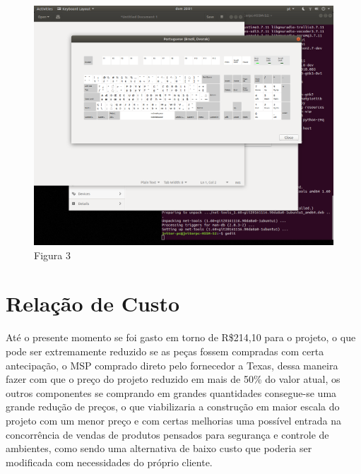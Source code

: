 \documentclass[conference,compsoc]{IEEEtran}
\begin{document}
\begin{figure}[!ht]
		\centering
		\includegraphics[scale=0.15]{nome_da_figura3.png}
		\caption{Figura 3}
\end{figure}


\section{Relação de Custo}
Até o presente momento se foi gasto em torno de R\$214,10 para o projeto, o que pode ser extremamente reduzido se as peças fossem compradas com certa antecipação, o MSP comprado direto pelo fornecedor a Texas, dessa maneira fazer com que o preço do projeto reduzido em mais de 50\% do valor atual, os outros componentes se comprando em grandes quantidades consegue-se uma grande redução de preços, o que viabilizaria a construção em maior escala do projeto com um menor preço e com certas melhorias uma possível entrada na concorrência de vendas de produtos pensados para segurança e controle de ambientes, como sendo uma alternativa de baixo custo que poderia ser modificada com necessidades do próprio cliente. \cite{referencia:1}








\end{document}
